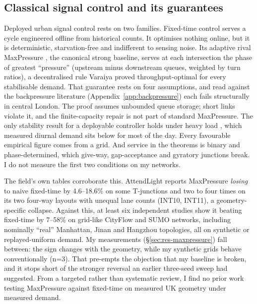 \subsection{Classical signal control and its guarantees}\label{sec:bg-classical}

Deployed urban signal control rests on two families. Fixed-time control serves a cycle engineered offline from historical counts. It optimises nothing online, but it is deterministic, starvation-free and indifferent to sensing noise. Its adaptive rival MaxPressure \cite{varaiya2013maxpressure}, the canonical strong baseline, serves at each intersection the phase of greatest ``pressure'' (upstream minus downstream queues, weighted by turn ratios), a decentralised rule Varaiya proved throughput-optimal for every stabilisable demand. That guarantee rests on four assumptions, and read against the backpressure literature (Appendix~\ref{app:backpressure}) each fails structurally in central London. The proof assumes unbounded queue storage; short links violate it, and the finite-capacity repair \cite{gregoire2014backpressure} is not part of standard MaxPressure. The only stability result for a deployable controller holds under heavy load \cite{gregoire2014routing}, which measured diurnal demand sits below for most of the day. Every favourable empirical figure comes from a grid. And service in the theorems is binary and phase-determined, which give-way, gap-acceptance and gyratory junctions break. I do not measure the first two conditions on my networks.

The field's own tables corroborate this. AttendLight \cite{oroojlooy2020attendlight} reports MaxPressure \emph{losing} to naive fixed-time by 4.6--18.6\% on some T-junctions and two to four times on its two four-way layouts with unequal lane counts (INT10, INT11), a geometry-specific collapse. Against this, at least six independent studies \cite{wei2019colight,lai2023llmlight,wang2025trafficr1,dglight2026,collmlight2025,curalight2026} show it beating fixed-time by 7--58\% on grid-like CityFlow and SUMO networks, including nominally ``real'' Manhattan, Jinan and Hangzhou topologies, all on synthetic or replayed-uniform demand. My measurements (\S\ref{sec:res-maxpressure}) fall between: the sign changes with the geometry, while my synthetic grids behave conventionally (n=3). That pre-empts the objection that my baseline is broken, and it stops short of the stronger reversal an earlier three-seed sweep had suggested. From a targeted rather than systematic review, I find no prior work testing MaxPressure against fixed-time on measured UK geometry under measured demand.
